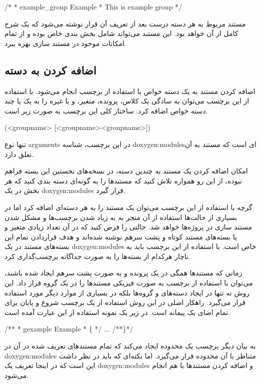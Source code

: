 \begin{C++}
/*
 *  example_group Example
 * This is example group
 */
\end{C++}

مستند مربوط به هر دسته درست بعد از تعریف آن قرار نوشته می‌شود که یک شرح کامل از
آن خواهد بود. این مستند می‌تواند
شامل بخش بندی خاص بوده و از تمام امکانات موجود در مستند سازی بهره ببرد.

\subsection{اضافه کردن به دسته}
اضافه کردن مستند به یک دسته خواص با استفاده از برچسب  انجام می‌شود. با
استفاده از این برچسب می‌توان به سادگی یک کلاس، پرونده، متغیر، و یا غیره را به یک یا چند
دسته خواص اضافه کرد. ساختار کلی این برچسب به صورت زیر است.

\begin{C++}
\ingroup (<groupname> [<groupname><groupname>])
\end{C++}
تنها نوع \glspl{argument} در این برچسب، شناسه \glspl{doxygen:module}‌ای است که مستند به آن 
تعلق دارد.

\begin{warning}
امکان اضافه کردن یک مستند به چندین دسته، در نسخه‌های نخستین این بسته فراهم نبوده، از
این رو همواره تلاش کنید که مستندها را به گونه‌ای دسته بندی کنید که هر بخش در یک \glspl{doxygen:module}
قرار گیرد.
\end{warning}

گرچه با استفاده از این برچسب می‌توان یک مستند را به هر دسته‌ای اضافه کرد اما در
بسیاری از حالت‌ها استفاده از آن منجر به به زیاد شدن برچسب‌ها و مشکل شدن مستند سازی
در پروژه‌ها خواهد شد. حالتی را فرض کنید که در آن تعداد زیادی متغیر و یا بسته‌های 
مستند کوتاه و پشت سرهم نوشته شده‌اند و هدف قراردادن تمام این بسته‌های مستند در یک
\glspl{doxygen:module} خاص است. با استفاده از این برچسب باید به ناچار هرکدام از بسته‌ها را به صورت
جداگانه برچسب‌گذاری کرد. 

زمانی که مستند‌ها همگی در یک پرونده و به صورت پشت سرهم ایجاد شده باشند، می‌توان با
استفاده از برچسب \lr{ \ \{  \ \}} به صورت فیزیکی مستند‌ها را در یک گروه قرار داد.
این روش نه تنها در ایجاد دسته‌های و گروه‌ها بلکه در بسیاری از موارد دیگر
مورد استفاده قرار می‌گیرد. راهکار اصلی در این روش استفاده از یک برچسب شروع و پایان
برای تمام اضای یک پیمانه است. در زیر یک نمونه استفاده از این عبارت آمده است.

\begin{C++}
/**
 *  gexample Example
 * \{
 */
 ...
/**\}*/
\end{C++}
به بیان دیگر برچسب  \lr{ \ \{  \ \}} یک محدوده ایجاد می‌کند که تمام مستندهای تعریف شده در آن
در \glspl{doxygen:module} متناظر با آن محدوده قرار می‌گیرد. اما نکته‌ای که باید در نظر داشت این است که
در اینجا تعریف یک \glspl{doxygen:module} و اضافه کردن مستندها با هم انجام می‌شود.

